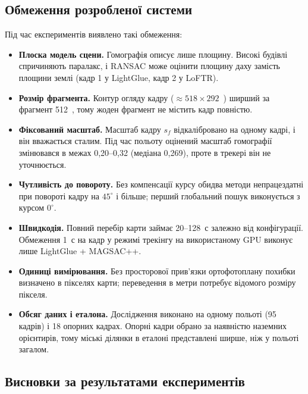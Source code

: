 
\subsection{Обмеження розробленої системи}

Під час експериментів виявлено такі обмеження:
\begin{itemize}
    \item \textbf{Плоска модель сцени.} Гомографія описує лише площину. Високі будівлі спричиняють паралакс, і RANSAC може оцінити площину даху замість площини землі (кадр 1 у LightGlue, кадр 2 у LoFTR).
    \item \textbf{Розмір фрагмента.} Контур огляду кадру ($\approx 518 \times 292$~\px{}) ширший за фрагмент 512~\px{}, тому жоден фрагмент не містить кадр повністю.
    \item \textbf{Фіксований масштаб.} Масштаб кадру $s_f$ відкалібровано на одному кадрі, і він вважається сталим. Під час польоту оцінений масштаб гомографії змінювався в межах 0,20--0,32 (медіана 0,269), проте в трекері він не уточнюється.
    \item \textbf{Чутливість до повороту.} Без компенсації курсу обидва методи непрацездатні при повороті кадру на $45^\circ$ і більше; перший глобальний пошук виконується з курсом $0^\circ$.
    \item \textbf{Швидкодія.} Повний перебір карти займає 20--128~с залежно від конфігурації. Обмеження 1~с на кадр у режимі трекінгу на використаному GPU виконує лише LightGlue + MAGSAC++.
    \item \textbf{Одиниці вимірювання.} Без просторової прив'язки ортофотоплану похибки визначено в пікселях карти; переведення в метри потребує відомого розміру пікселя.
    \item \textbf{Обсяг даних і еталона.} Дослідження виконано на одному польоті (95 кадрів) і 18 опорних кадрах. Опорні кадри обрано за наявністю наземних орієнтирів, тому міські ділянки в еталоні представлені ширше, ніж у польоті загалом.
\end{itemize}

\subsection{Висновки за результатами експериментів}

